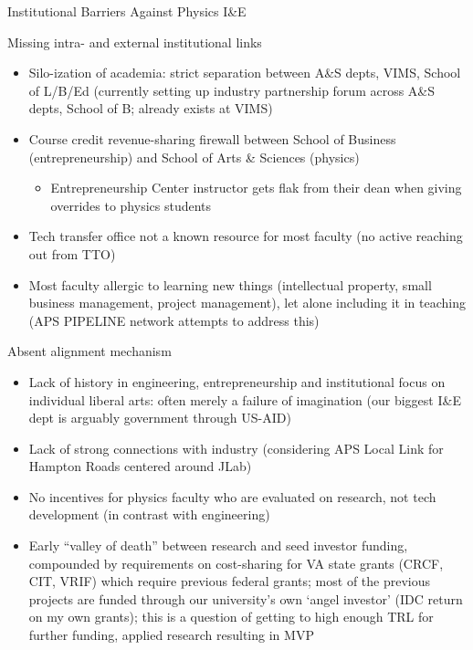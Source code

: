 \documentclass[xcolor={dvipsnames},professionalfonts]{beamer}
\begin{document}
\begin{frame}[allowframebreaks]{Institutional Barriers Against Physics I\&E}
 \begin{block}{Missing intra- and external institutional links}
  \begin{itemize}
   \item Silo-ization of academia: strict separation between A\&S depts, VIMS, School of L/B/Ed (currently setting up industry partnership forum across A\&S depts, School of B; already exists at VIMS)
   \item Course credit revenue-sharing firewall between School of Business (entrepreneurship) and School of Arts \& Sciences (physics)
   \begin{itemize}
    \item Entrepreneurship Center instructor gets flak from their dean when giving overrides to physics students
   \end{itemize}
   \item Tech transfer office not a known resource for most faculty (no active reaching out from TTO)
   \item Most faculty allergic to learning new things (intellectual property, small business management, project management), let alone including it in teaching (APS PIPELINE network attempts to address this)
  \end{itemize}
 \end{block}
 \begin{block}{Absent alignment mechanism}
  \begin{itemize}
   \item Lack of history in engineering, entrepreneurship and institutional focus on individual liberal arts: often merely a failure of imagination (our biggest I\&E dept is arguably government through US-AID)
   \item Lack of strong connections with industry (considering APS Local Link for Hampton Roads centered around JLab)
   \item No incentives for physics faculty who are evaluated on research, not tech development (in contrast with engineering)
   \item Early ``valley of death'' between research and seed investor funding, compounded by requirements on cost-sharing for VA state grants (CRCF, CIT, VRIF) which require previous federal grants; most of the previous projects are funded through our university's own `angel investor' (IDC return on my own grants); this is a question of getting to high enough TRL for further funding, applied research resulting in MVP
  \end{itemize}
 \end{block}
\end{frame}
\end{document}
